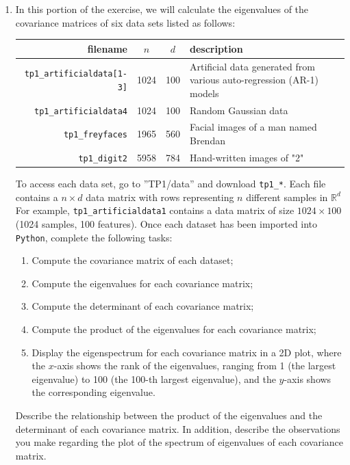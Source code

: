\documentclass[a4paper]{article}
\begin{document}
\begin{enumerate}
    \hrulefill \\
    
    
    \item In this portion of the exercise, we will calculate the eigenvalues of the covariance matrices of six data sets listed as follows:
    \begin{table}[H]
    \centering
    \begin{tabularx}{.7\textwidth}{rccX}
    \hline
    filename                          & $n$  & $d$ & description                                                          \\ \hline
    \texttt{tp1\_artificialdata[1-3]} & 1024 & 100 & Artificial data generated from various auto-regression (AR-1) models \\
    \texttt{tp1\_artificialdata4}     & 1024 & 100 & Random Gaussian data                                                 \\
    \texttt{tp1\_freyfaces}           & 1965 & 560 & Facial images of a man named Brendan                                         \\
    \texttt{tp1\_digit2}              & 5958 & 784 & Hand-written images of "2"                                           \\ \hline
    \end{tabularx}
    \end{table}
    To access each data set, go to ''TP1/data'' and download \texttt{tp1\_*}.
    Each file contains a $n \times d$ data matrix with rows representing $n$ different samples in $\mathbb{R}^d$
    For example, \texttt{tp1\_artificialdata1} contains a data matrix of size $1024 \times 100$ (1024 samples, 100 features).
    Once each dataset has been imported into \texttt{Python}, complete the following tasks:
    
    \begin{enumerate}[label=(\alph*)]
        \item Compute the covariance matrix of each dataset;
        
        \item Compute the eigenvalues for each covariance matrix;
        
        \item Compute the determinant of each covariance matrix;
        
        \item Compute the product of the eigenvalues for each covariance matrix;
        
        \item Display the eigenspectrum for each covariance matrix in a 2D plot, where the $x$-axis shows the rank of the eigenvalues, ranging from 1 (the largest eigenvalue) to 100 (the 100-th largest eigenvalue), and the $y$-axis shows the corresponding eigenvalue.
    \end{enumerate}
    Describe the relationship between the product of the eigenvalues and the determinant of each covariance matrix.
    In addition, describe the observations you make regarding the plot of the spectrum of eigenvalues of each covariance matrix.


\end{enumerate}
\end{document}
